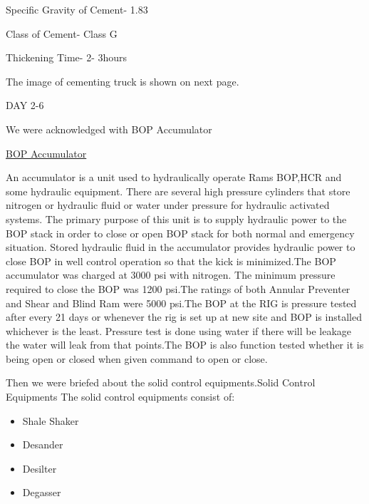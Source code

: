 \documentclass[11pt,a4paper]{article}
\begin{document}
Specific Gravity of Cement- 1.83

Class of Cement- Class G

Thickening Time- 2- 3hours

The image of cementing truck is shown on next page.

DAY 2-6

We were acknowledged with BOP Accumulator


\underline{BOP Accumulator}

An accumulator is a unit used to hydraulically operate Rams BOP,HCR and some hydraulic equipment. There are several high pressure cylinders that store nitrogen or hydraulic fluid or water under pressure for hydraulic activated systems. The primary purpose of this unit is to supply hydraulic power to the BOP stack in order to close or open BOP stack for both normal and emergency situation. Stored hydraulic fluid in the accumulator provides hydraulic power to close BOP in well control operation so that the kick is minimized.The BOP accumulator was charged at 3000 psi with nitrogen. The minimum pressure required to close the BOP was 1200 psi.The ratings of both Annular Preventer and Shear and Blind Ram were 5000 psi.The BOP at the RIG is pressure tested after every 21 days or whenever the rig is set up at new site and BOP is installed whichever is the least. Pressure test is done using water if there will be leakage the water will leak from that points.The BOP is also function tested whether it is being open or closed when given command to open or close.


\noindent Then we were briefed about the solid control equipments.Solid Control Equipments The solid control equipments consist of:

\begin{itemize}

\item Shale Shaker
\item Desander
\item Desilter
\item Degasser

\end{itemize}

 
\end{document}

